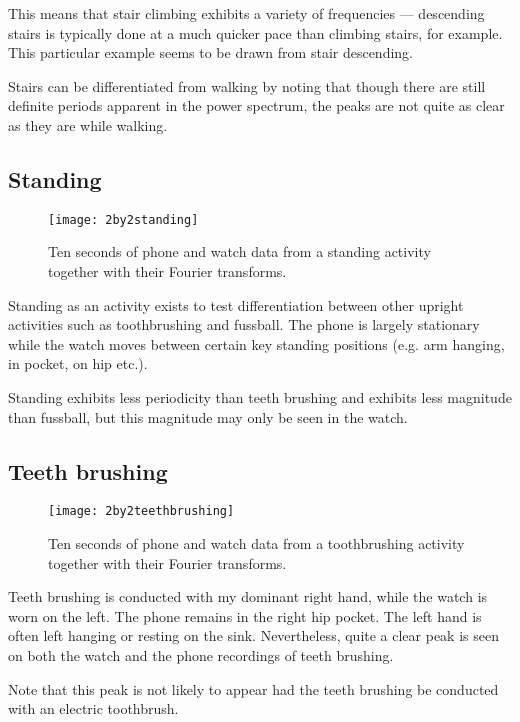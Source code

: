      This means that stair climbing exhibits a variety of frequencies --- descending stairs is typically done at a much quicker pace than climbing stairs, for example. This particular example seems to be drawn from stair descending.
      
      Stairs can be differentiated from walking by noting that though there are still definite periods apparent in the power spectrum, the peaks are not quite as clear as they are while walking.
    \pagebreak[4]
    \subsection{Standing}
      \begin{figure}[!th]
        \centering
        \texttt{[image: 2by2standing]}
        \caption[Standing sample]{Ten seconds of phone and watch data from a standing activity together with their Fourier transforms.}
        \label{fig:2by2standing}
      \end{figure}
      Standing as an activity exists to test differentiation between other upright activities such as toothbrushing and fussball. The phone is largely stationary while the watch moves between certain key standing positions (e.g. arm hanging, in pocket, on hip etc.). 
      
      Standing exhibits less periodicity than teeth brushing and exhibits less magnitude than fussball, but this magnitude may only be seen in the watch.
    \pagebreak[4]
    \subsection{Teeth brushing}
      \begin{figure}[!th]
        \centering
        \texttt{[image: 2by2teethbrushing]}
        \caption[Teethbrushing sample]{Ten seconds of phone and watch data from a toothbrushing activity together with their Fourier transforms.}
        \label{fig:2by2teethbrushing}
      \end{figure}
      
      Teeth brushing is conducted with my dominant right hand, while the watch is worn on the left. The phone remains in the right hip pocket. The left hand is often left hanging or resting on the sink. Nevertheless, quite a clear peak is seen on both the watch and the phone recordings of teeth brushing.
      
      Note that this peak is not likely to appear had the teeth brushing be conducted with an electric toothbrush.
      

